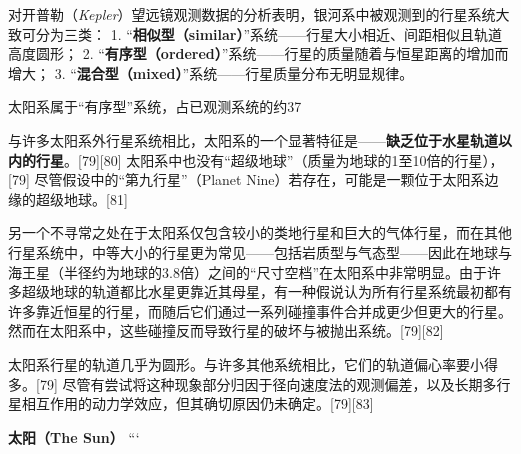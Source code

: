 对开普勒（\textit{Kepler}）望远镜观测数据的分析表明，银河系中被观测到的行星系统大致可分为三类：  
1. “\textbf{相似型（similar）}”系统——行星大小相近、间距相似且轨道高度圆形；  
2. “\textbf{有序型（ordered）}”系统——行星的质量随着与恒星距离的增加而增大；  
3. “\textbf{混合型（mixed）}”系统——行星质量分布无明显规律。  

太阳系属于“有序型”系统，占已观测系统的约37%

与许多太阳系外行星系统相比，太阳系的一个显著特征是——\textbf{缺乏位于水星轨道以内的行星}。[79][80]  
太阳系中也没有“超级地球”（质量为地球的1至10倍的行星），[79] 尽管假设中的“第九行星”（Planet Nine）若存在，可能是一颗位于太阳系边缘的超级地球。[81]

另一个不寻常之处在于太阳系仅包含较小的类地行星和巨大的气体行星，而在其他行星系统中，中等大小的行星更为常见——包括岩质型与气态型——因此在地球与海王星（半径约为地球的3.8倍）之间的“尺寸空档”在太阳系中非常明显。由于许多超级地球的轨道都比水星更靠近其母星，有一种假说认为所有行星系统最初都有许多靠近恒星的行星，而随后它们通过一系列碰撞事件合并成更少但更大的行星。然而在太阳系中，这些碰撞反而导致行星的破坏与被抛出系统。[79][82]

太阳系行星的轨道几乎为圆形。与许多其他系统相比，它们的轨道偏心率要小得多。[79] 尽管有尝试将这种现象部分归因于径向速度法的观测偏差，以及长期多行星相互作用的动力学效应，但其确切原因仍未确定。[79][83]

\textbf{太阳（The Sun）}
```



